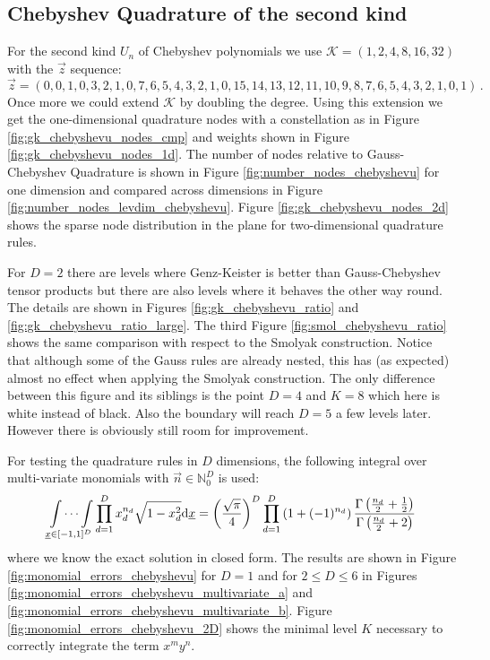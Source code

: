 \documentclass[a4paper,10pt]{article}
\begin{document}
\FloatBarrier
\subsection{Chebyshev Quadrature of the second kind}

For the second kind $U_n$ of Chebyshev polynomials we use
$\mathcal{K} = (1, 2, 4, 8, 16, 32)$ with the $\vec{z}$ sequence:
\begin{equation*}
  \vec{z} = (0, 0, 1, 0, 3, 2, 1, 0, 7, 6, 5, 4, 3, 2, 1, 0, 15, 14, 13, 12, 11,
             10, 9, 8, 7, 6, 5, 4, 3, 2, 1, 0, 1)\,.
\end{equation*}
Once more we could extend $\mathcal{K}$ by doubling the degree.
Using this extension we get the one-dimensional quadrature nodes
with a constellation as in Figure \ref{fig:gk_chebyshevu_nodes_cmp}
and weights shown in Figure \ref{fig:gk_chebyshevu_nodes_1d}.
The number of nodes relative to Gauss-Chebyshev Quadrature is shown
in Figure \ref{fig:number_nodes_chebyshevu} for one dimension and
compared across dimensions in Figure \ref{fig:number_nodes_levdim_chebyshevu}.
Figure \ref{fig:gk_chebyshevu_nodes_2d} shows the sparse
node distribution in the plane for two-dimensional quadrature rules.

For $D = 2$ there are levels where Genz-Keister is better than
Gauss-Chebyshev tensor products but there are also levels where
it behaves the other way round. The details are shown in Figures
\ref{fig:gk_chebyshevu_ratio} and \ref{fig:gk_chebyshevu_ratio_large}.
The third Figure \ref{fig:smol_chebyshevu_ratio} shows the same
comparison with respect to the Smolyak construction.
Notice that although some of the Gauss rules are already nested, this has
(as expected) almost no effect when applying the Smolyak construction.
The only difference between this figure and its siblings is the point
$D=4$ and $K=8$ which here is white instead of black. Also the boundary
will reach $D=5$ a few levels later. However there is obviously still
room for improvement.

For testing the quadrature rules in $D$ dimensions, the following integral
over multi-variate monomials with $\vec{n} \in \mathbb{N}_0^D$ is used:
\begin{equation} \label{eq:chebyshevu_exact_solution}
  \idotsint \limits_{\underline{x} \in [-1,1]^D} \prod_{d=1}^D x_d^{n_d} \sqrt{1-x_d^2} \mathrm{d}\underline{x}
  =
  \left(\frac{\sqrt{\pi}}{4}\right)^D
  \prod_{d=1}^D \left(1 + (-1)^{n_d}\right)
  \frac{\Gamma\left(\frac{n_d}{2}+\frac{1}{2}\right)}
       {\Gamma\left(\frac{n_d}{2}+2\right)}
\end{equation}
where we know the exact solution in closed form. The results are shown in
Figure \ref{fig:monomial_errors_chebyshevu} for $D=1$ and for $2 \leq D \leq 6$
in Figures \ref{fig:monomial_errors_chebyshevu_multivariate_a} and
\ref{fig:monomial_errors_chebyshevu_multivariate_b}.
Figure \ref{fig:monomial_errors_chebyshevu_2D} shows the minimal
level $K$ necessary to correctly integrate the term $x^m y^n$.
\end{document}
